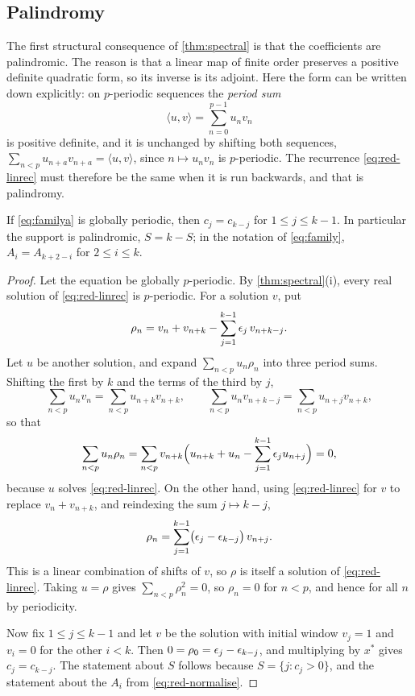 \subsection{Palindromy}

The first structural consequence of \autoref{thm:spectral} is that the
coefficients are palindromic. The reason is that a linear map of finite order
preserves a positive definite quadratic form, so its inverse is its adjoint.
Here the form can be written down explicitly: on $p$-periodic sequences the
\textit{period sum}
\[
\langle u,v\rangle=\sum_{n=0}^{p-1}u_nv_n
\]
is positive definite, and it is unchanged by shifting both sequences,
$\sum_{n<p}u_{n+a}v_{n+a}=\langle u,v\rangle$, since $n\mapsto u_nv_n$ is
$p$-periodic. The recurrence \eqref{eq:red-linrec} must therefore be the same when
it is run backwards, and that is palindromy.

\begin{theorem}[palindromy]
\label{thm:palindromy}
If \eqref{eq:familya} is globally periodic, then $c_j=c_{k-j}$ for
$1\le j\le k-1$. In particular the support is palindromic, $S=k-S$; in the
notation of \eqref{eq:family}, $A_i=A_{k+2-i}$ for $2\le i\le k$.
\end{theorem}

\begin{proof}
Let the equation be globally $p$-periodic. By \autoref{thm:spectral}(i), every
real solution of \eqref{eq:red-linrec} is $p$-periodic. For a solution $v$, put
\[
\rho_n=v_n+v_{n+k}-\sum_{j=1}^{k-1}\epsilon_j\,v_{n+k-j}.
\]
Let $u$ be another solution, and expand $\sum_{n<p}u_n\rho_n$ into three period
sums. Shifting the first by $k$ and the terms of the third by $j$,
\[
\sum_{n<p}u_nv_n=\sum_{n<p}u_{n+k}v_{n+k},\qquad
\sum_{n<p}u_nv_{n+k-j}=\sum_{n<p}u_{n+j}v_{n+k},
\]
so that
\[
\sum_{n<p}u_n\rho_n
=\sum_{n<p}v_{n+k}\Bigl(u_{n+k}+u_n-\sum_{j=1}^{k-1}\epsilon_ju_{n+j}\Bigr)=0,
\]
because $u$ solves \eqref{eq:red-linrec}. On the other hand, using
\eqref{eq:red-linrec} for $v$ to replace $v_n+v_{n+k}$, and reindexing the sum
$j\mapsto k-j$,
\[
\rho_n=\sum_{j=1}^{k-1}\bigl(\epsilon_j-\epsilon_{k-j}\bigr)\,v_{n+j}.
\]
This is a linear combination of shifts of $v$, so $\rho$ is itself a solution of
\eqref{eq:red-linrec}. Taking $u=\rho$ gives $\sum_{n<p}\rho_n^2=0$, so $\rho_n=0$ for
$n<p$, and hence for all $n$ by periodicity.

Now fix $1\le j\le k-1$ and let $v$ be the solution with initial window
$v_j=1$ and $v_i=0$ for the other $i<k$. Then
$0=\rho_0=\epsilon_j-\epsilon_{k-j}$, and multiplying by $x^*$ gives $c_j=c_{k-j}$. The
statement about $S$ follows because $S=\{j:c_j>0\}$, and the statement about the
$A_i$ from \eqref{eq:red-normalise}.
\end{proof}

